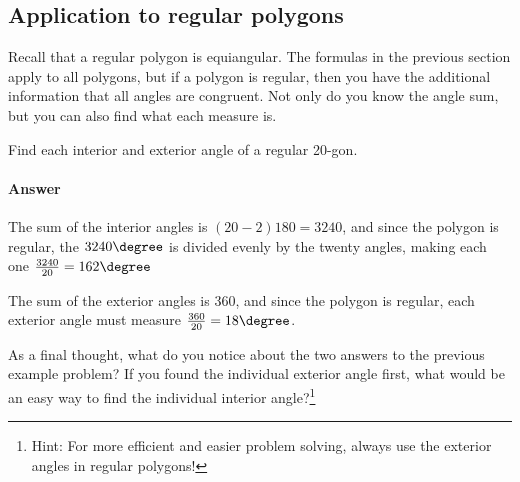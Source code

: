 \subsection{Application to regular polygons}

Recall that a regular polygon is equiangular. 
The formulas in the previous section apply to all polygons,
but if a polygon is regular, 
then you have the additional information that all angles are congruent.
Not only do you know the angle sum,
but you can also find what each measure is.

\noindent \q Find each interior and exterior angle of a regular 20-gon.

\paragraph{Answer} The sum of the interior angles is $(20-2)180=3240$,
and since the polygon is regular, the $3240\degree$ is divided evenly by the
twenty angles, making each one $\frac{3240}{20}=162\degree$

The sum of the exterior angles is 360, and since the polygon is regular,
each exterior angle must measure $\frac{360}{20}=18\degree$.

\noindent \q As a final thought, what do you notice about the two answers to the previous example problem?  If you found the individual exterior angle first, what would be an easy way to find the individual interior angle?\footnote{Hint:  For more efficient and easier problem solving, always use the exterior angles in regular polygons!}

\vfill

